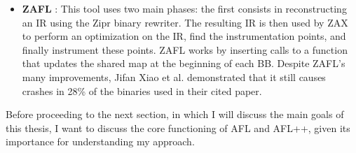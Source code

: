 \begin{itemize}
\begin{itemize}
                    \item \textbf{ZAFL} \cite{zafl}: This tool uses two main phases: the first consists in
                        reconstructing an \gls{IR} using the Zipr binary rewriter.
                        The resulting \gls{IR} is then used by ZAX to perform an optimization on the \gls{IR}, find the instrumentation points,
                        and finally instrument these points. ZAFL works by inserting calls to a function that updates the shared map
                        at the beginning of each \gls{BB}.
                        Despite ZAFL's many improvements, Jifan Xiao et al. \cite{SystemCallPatternTracing} demonstrated that
                        it still causes crashes in 28\% of the binaries used in their cited paper.
                \end{itemize}
        \end{itemize}
        Before proceeding to the next section, in which I will discuss the main goals of this thesis, I want to discuss the core functioning of AFL and AFL++,
        given its importance for understanding my approach.

